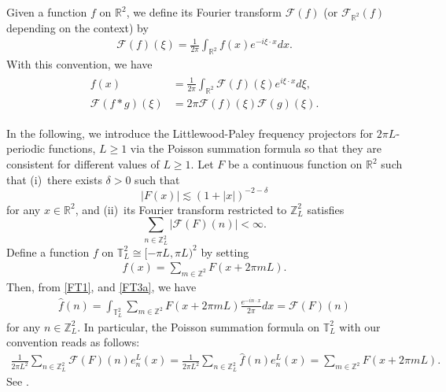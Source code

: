 \documentclass[letterpaper, 11pt,  reqno]{amsart}
\theoremstyle{myremark}
\newcommand{\1}{\hspace{0.5mm}\text{I}\hspace{0.5mm}}
\newcommand{\Z}{\mathbb{Z}}
\newcommand{\R}{\mathbb{R}}
\newcommand{\T}{\mathbb{T}}
\newcommand{\F}{\mathcal{F}}
\newcommand{\al}{\alpha}
\newcommand{\dl}{\delta}
\newcommand{\nb}{\nabla}
\newcommand{\ft}{\widehat}
\newcommand{\les}{\lesssim}
\newcommand{\jb}[1]
{\langle #1 \rangle}
\newcommand{\N}{\mathbb{N}}
\numberwithin{equation}{section}
\numberwithin{theorem}{section}
\begin{document}
Given a function $f$ on $\R^2$,
we define its Fourier transform 
 $\F(f)$ (or $\F_{\R^2}(f)$ depending on the context)  by 
\begin{align}
 \F(f) (\xi) = \frac 1{2\pi}\int_{\R^2} f(x) e^{- i \xi\cdot  x} dx.
 \label{FT3a}
\end{align}
With this convention, we have
\begin{align}
\begin{split}
f(x)  & = \frac 1{2\pi} \int_{\R^2} \F(f)(\xi) e^{i \xi \cdot x} d\xi,\\
\F(f*g)(\xi)
& = 2\pi
\F(f)(\xi) \F(g)(\xi).
\end{split}
\label{FT4}
\end{align}






In the following, 
we  introduce 
 the Littlewood-Paley frequency projectors
for 
  $2\pi L$-periodic functions, $L \ge 1$
  via
the Poisson summation formula
so that they are consistent for different values of  $L \ge 1$.
Let $F$ be a continuous function on $\R^2$ 
such that (i)~there exists $\dl > 0$ such that 
\[|F(x)| \les (1+|x|)^{-2-\dl}\]
for any $x \in \R^2$, 
and (ii)~its Fourier transform restricted to $\Z^2_L$ satisfies 
\[ \sum_{n \in \Z^2_L} |\F(F)(n)| < \infty.\]
Define a function $f$ on $\T_L^2 \cong [-\pi L , \pi L)^2$ by setting
\begin{align}
 f(x) = \sum_{m \in \Z^2} F(x + 2\pi mL).
 \label{Poi1y}
\end{align}
Then, from \eqref{FT1}, and \eqref{FT3a}, 
we have 
\begin{align}
 \ft f (n) =  \int_{\T^2_L} \sum_{m \in \Z^2} F(x + 2\pi m L) \frac{e^{-  i n\cdot  x}}{2\pi }dx
=  \F (F) (n)
\label{Poi1}
\end{align}
for any $n \in \Z_L^2$.
In particular, 
the Poisson summation formula
on $\T^2_L$ with our convention
reads as follows:
\begin{align}
\frac{1}{2\pi L^2}\sum_{n \in \Z^2_L} \F (F)(n) e^L_n(x) 
= 
\frac{1}{2\pi L^2} \sum_{n \in \Z^2_L} \ft f(n) e^L_n(x) 
= 
 \sum_{m \in \Z^2} F(x + 2\pi m L).
%
\label{Poi0}
\end{align}
See
\cite[Theorem 3.2.8]{Gra1}.

\end{document}

